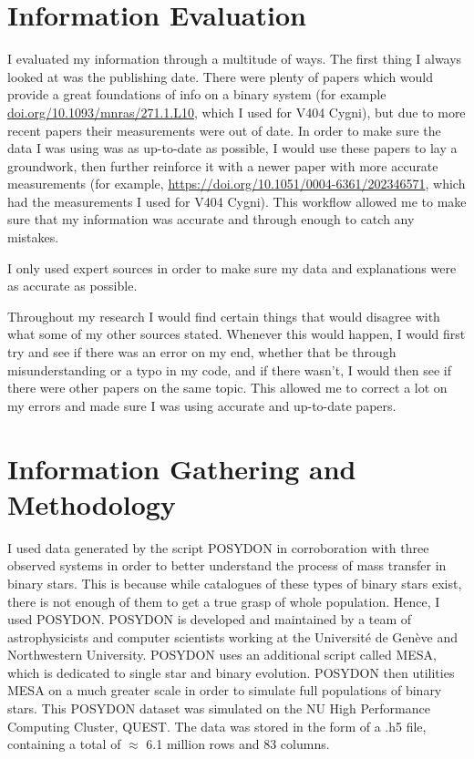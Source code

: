 \documentclass[12pt, a4paper]{article}
\begin{document}
\section{Information Evaluation}
    I evaluated my information through a multitude of ways. The first thing I always looked at was the publishing date. There were plenty of papers which would provide a great foundations of info on a binary system (for example \url{doi.org/10.1093/mnras/271.1.L10}, which I used for V404 Cygni), but due to more recent papers their measurements were out of date. In order to make sure the data I was using was as up-to-date as possible, I would use these papers to lay a groundwork, then further reinforce it with a newer paper with more accurate measurements (for example, \url{https://doi.org/10.1051/0004-6361/202346571}, which had the measurements I used for V404 Cygni). This workflow allowed me to make sure that my information was accurate and through enough to catch any mistakes.

    I only used expert sources in order to make sure my data and explanations were as accurate as possible.

    Throughout my research I would find certain things that would disagree with what some of my other sources stated. Whenever this would happen, I would first try and see if there was an error on my end, whether that be through misunderstanding or a typo in my code, and if there wasn't, I would then see if there were other papers on the same topic. This allowed me to correct a lot on my errors and made sure I was using accurate and up-to-date papers. 

\section{Information Gathering and Methodology}

    I used data generated by the script POSYDON in corroboration with three observed systems in order to better understand the process of mass transfer in binary stars. This is because while catalogues of these types of binary stars exist, there is not enough of them to get a true grasp of whole population. Hence, I used POSYDON. POSYDON is developed and maintained by a team of astrophysicists and computer scientists working at the Université de Genève and Northwestern University. POSYDON uses an additional script called MESA, which is dedicated to single star and binary evolution. POSYDON then utilities MESA on a much greater scale in order to simulate full populations of binary stars. This POSYDON dataset was simulated on the NU High Performance Computing Cluster, QUEST. The data was stored in the form of a .h5 file, containing a total of $\approx$ 6.1 million rows and 83 columns.
\end{document}
